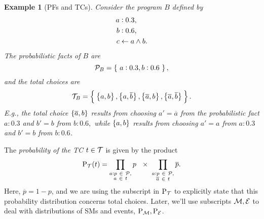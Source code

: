 \documentclass[a4paper]{article}
\newtheorem{example}{Example}
\newtheorem{example}{Example}
\newcommand{\eat}[1]{}
\newcommand{\at}[1]{\ensuremath{\!\del{#1}}}        %
\newcommand{\cla}[1]{\ensuremath{{\cal #1}}}        %
\newcommand{\clause}{\ensuremath{\leftarrow}}
\newcommand{\co}[1]{\ensuremath{\overline{#1}}}     %
\newcommand{\PROBFset}{\ensuremath{\cla{P}}}
\newcommand{\TCHOICEset}{\ensuremath{\cla{T}}}
\newcommand{\MODELset}{\ensuremath{\cla{M}}}
\newcommand{\EVENTSset}{\ensuremath{\cla{E}}}
\newcommand{\prfunc}{\ensuremath{\mathrm{P}}}
\newcommand{\prd}[1]{\ensuremath{\prfunc_{#1}}}
\newcommand{\prT}{\prd{\TCHOICEset}}
\newcommand{\prM}{\prd{\MODELset}}
\newcommand{\prE}{\prd{\EVENTSset}}
\newcommand{\probfact}[2]{\ensuremath{#1:#2}}
\newcommand{\franc}[1]{{\color{green!30!black}#1}}
\begin{document}
\begin{example}[\Aclp{PF} and \aclp{TC}]
  \label{ex:total.choices}\em \eat{\franc{Example of total choices
      with more probabilistic facts.}}
    Consider the program $B$ defined by
    \begin{equation*}
        \begin{split}
            \probfact{a&}{0.3},\\
            \probfact{b&}{0.6},\\
            c & \clause a \wedge b.
        \end{split}\label{eq:total.choices}
    \end{equation*}
    The probabilistic facts of \(B\) are
       \[ \PROBFset_{B} = \set{~\probfact{a}{0.3}, \probfact{b}{0.6}~}, \]
    and the total choices are
       \[ \TCHOICEset_{B} = \set[2]{\:
            \set[1]{a, b},
            \set[1]{a, \co{b}},
            \set[1]{\co{a}, b},
            \set[1]{\co{a}, \co{b}}\: }. \]
    E.g., the total choice \(\set{\co{a}, b} \)
    results from choosing \(a' = \co{a}\) from the probabilistic fact
    $\probfact{a}{0.3}$ and $b' = b$ from \(\probfact{b}{0.6}, \)
    while \(\set{a, b} \) results from choosing \(a' = a\) from
    \(\probfact{a}{0.3}\) and \(b' = b\) from \(\probfact{b}{0.6}\).
\end{example}

The \emph{probability of the \acl{TC} \(t \in \TCHOICEset\)} is given
by the product
\begin{equation}
    \prT\at{t} =
    \prod_{\substack{
            \probfact{a}{p}~ \in ~\PROBFset,\\
            a~ \in~ t}} p\ \ \times\
    \prod_{\substack{
            \probfact{a}{p}~ \in ~\PROBFset,\\
            \co{a}~\in~ t}} \co{p}.
    \label{eq:prob.total.choice}
\end{equation}
Here, $\co{p} = 1 - p$, and we are using the subscript in \(\prT\) to
explicitly state that this probability distribution concerns total
choices.  Later, we'll use subscripts \(\MODELset, \EVENTSset\) to
deal with distributions of \aclp{SM} and events, \(\prM, \prE\).
\end{document}

